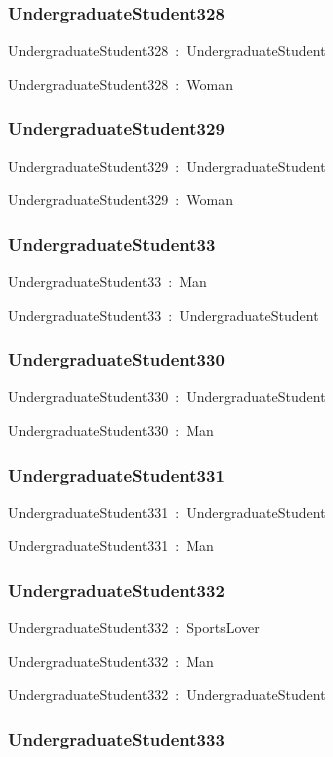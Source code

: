\documentclass{article}
\begin{document}
\subsubsection*{UndergraduateStudent328}

UndergraduateStudent328~:~UndergraduateStudent

UndergraduateStudent328~:~Woman

\subsubsection*{UndergraduateStudent329}

UndergraduateStudent329~:~UndergraduateStudent

UndergraduateStudent329~:~Woman

\subsubsection*{UndergraduateStudent33}

UndergraduateStudent33~:~Man

UndergraduateStudent33~:~UndergraduateStudent

\subsubsection*{UndergraduateStudent330}

UndergraduateStudent330~:~UndergraduateStudent

UndergraduateStudent330~:~Man

\subsubsection*{UndergraduateStudent331}

UndergraduateStudent331~:~UndergraduateStudent

UndergraduateStudent331~:~Man

\subsubsection*{UndergraduateStudent332}

UndergraduateStudent332~:~SportsLover

UndergraduateStudent332~:~Man

UndergraduateStudent332~:~UndergraduateStudent

\subsubsection*{UndergraduateStudent333}
\end{document}
